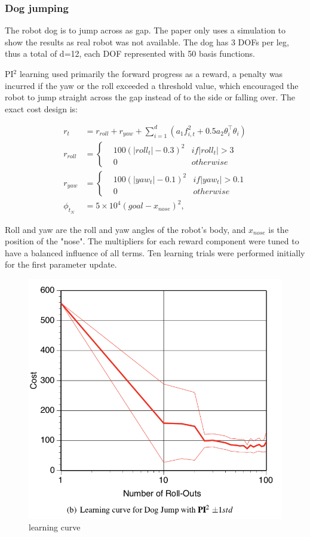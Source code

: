 \documentclass[journal]{IEEEtran}
\begin{document}
\subsubsection{Dog jumping}

The robot dog is to jump across as gap. The paper only uses a simulation to show the results as real robot was not available. 
The dog has 3 DOFs per leg, thus a total of d=12, each DOF represented with 50 basis functions. 

PI$^2$ learning used primarily the forward progress as a reward, a penalty was incurred if the yaw or the roll exceeded a threshold value, which encouraged the
robot to jump straight across the gap instead of to the side or falling over. The exact cost design is:

\begin{equation} 
  \begin{aligned}
    r_t &= r_{roll}+ r_{yaw} + \sum_{i=1}^{d}(a_1 f_{i,t}^2 + 0.5a_2 \theta_i^{\top}\theta_i) \\
  r_{roll} &= \left\{ \begin{array}{rcl} &100(|roll_t|-0.3)^2 & if |roll_t|>3 \\ &0 &otherwise \end{array} \right. \nonumber \\ 
  r_{yaw} &= \left\{ \begin{array}{rcl} &100(|yaw_t|-0.1)^2 & if |yaw_t|>0.1 \\ &0 &otherwise \end{array} \right. \nonumber \\
    \phi_{t_N}& = 5 \times 10^{4} (goal -x_{nose})^2,   
  \end{aligned}
\end{equation}

Roll and yaw are the roll and yaw angles of the robot's body, and $x_{nose}$ is the position of the "nose".
The multipliers for each reward component were tuned to have a balanced influence of all terms. Ten learning trials were performed initially for the first parameter update.
 
\begin{figure}[htbp]
  \centering
  \includegraphics[width = .3\textwidth]{dog}
  \caption{learning curve}
  \label{dog}
\end{figure}
\end{document}
